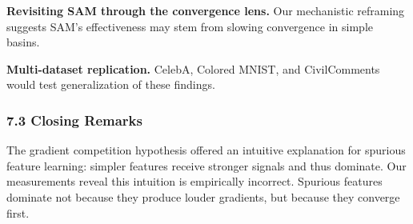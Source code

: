 \textbf{Revisiting SAM through the convergence lens.} Our mechanistic reframing suggests SAM's effectiveness may stem from slowing convergence in simple basins.

\textbf{Multi-dataset replication.} CelebA, Colored MNIST, and CivilComments would test generalization of these findings.

\subsubsection{7.3 Closing Remarks}

The gradient competition hypothesis offered an intuitive explanation for spurious feature learning: simpler features receive stronger signals and thus dominate. Our measurements reveal this intuition is empirically incorrect. Spurious features dominate not because they produce louder gradients, but because they converge first.
